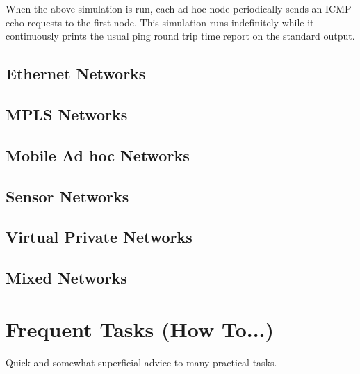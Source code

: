 
When the above simulation is run, each ad hoc node periodically sends an
ICMP echo requests to the first node. This simulation runs indefinitely
while it continuously prints the usual ping round trip time report on the
standard output.

\subsection{Ethernet Networks}


\subsection{MPLS Networks}


\subsection{Mobile Ad hoc Networks}


\subsection{Sensor Networks}


\subsection{Virtual Private Networks}


\subsection{Mixed Networks}




\section{Frequent Tasks (How To...)}

Quick and somewhat superficial advice to many practical tasks.

